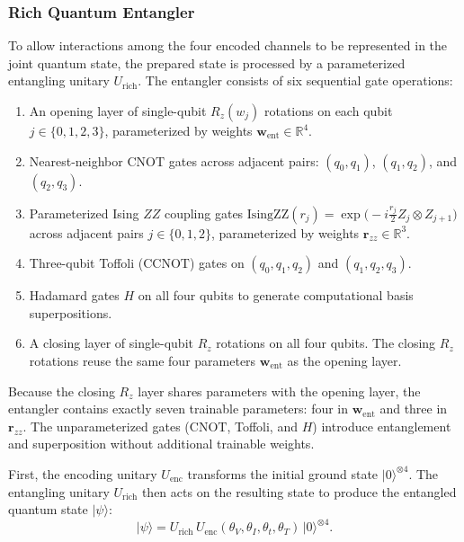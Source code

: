 \documentclass[a4paper,fleqn]{cas-sc}
\begin{document}
\subsubsection{Rich Quantum Entangler}

To allow interactions among the four encoded channels to be represented in the joint quantum state, the prepared state is processed by a parameterized entangling unitary $U_{\mathrm{rich}}$. The entangler consists of six sequential gate operations:
\begin{enumerate}[leftmargin=*,noitemsep,topsep=2pt]
\item An opening layer of single-qubit $R_z(w_j)$ rotations on each qubit $j \in \{0, 1, 2, 3\}$, parameterized by weights $\mathbf{w}_{\mathrm{ent}} \in \mathbb{R}^4$.
\item Nearest-neighbor $\mathrm{CNOT}$ gates across adjacent pairs: $(q_0, q_1)$, $(q_1, q_2)$, and $(q_2, q_3)$.
\item Parameterized Ising $ZZ$ coupling gates $\mathrm{IsingZZ}(r_j) = \exp\bigl(-i\frac{r_j}{2} Z_j \otimes Z_{j+1}\bigr)$ across adjacent pairs $j \in \{0, 1, 2\}$, parameterized by weights $\mathbf{r}_{zz} \in \mathbb{R}^3$.
\item Three-qubit Toffoli ($\mathrm{CCNOT}$) gates on $(q_0, q_1, q_2)$ and $(q_1, q_2, q_3)$.
\item Hadamard gates $H$ on all four qubits to generate computational basis superpositions.
\item A closing layer of single-qubit $R_z$ rotations on all four qubits. The closing $R_z$ rotations reuse the same four parameters $\mathbf{w}_{\mathrm{ent}}$ as the opening layer.
\end{enumerate}
Because the closing $R_z$ layer shares parameters with the opening layer, the entangler contains exactly seven trainable parameters: four in $\mathbf{w}_{\mathrm{ent}}$ and three in $\mathbf{r}_{zz}$. The unparameterized gates ($\mathrm{CNOT}$, Toffoli, and $H$) introduce entanglement and superposition without additional trainable weights.

First, the encoding unitary $U_{\mathrm{enc}}$ transforms the initial ground state $\lvert 0\rangle^{\otimes 4}$. The entangling unitary $U_{\mathrm{rich}}$ then acts on the resulting state to produce the entangled quantum state $\lvert\psi\rangle$:
\begin{equation}
\lvert\psi\rangle = U_{\mathrm{rich}}\, U_{\mathrm{enc}}(\theta_V, \theta_I, \theta_t, \theta_T)\,\lvert 0\rangle^{\otimes 4}.
\label{eq:psi}
\end{equation}
\end{document}
